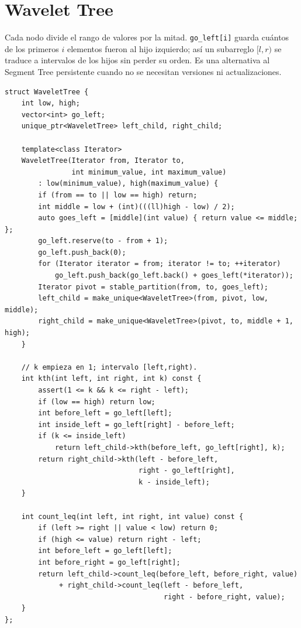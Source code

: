 \section{Wavelet Tree}

Cada nodo divide el rango de valores por la mitad. \texttt{go\_left[i]} guarda
cu\'antos de los primeros $i$ elementos fueron al hijo izquierdo; as\'i un
subarreglo $[l,r)$ se traduce a intervalos de los hijos sin perder su orden.
Es una alternativa al Segment Tree persistente cuando no se necesitan
versiones ni actualizaciones.


\begin{lstlisting}[style=cpp]
struct WaveletTree {
    int low, high;
    vector<int> go_left;
    unique_ptr<WaveletTree> left_child, right_child;

    template<class Iterator>
    WaveletTree(Iterator from, Iterator to,
                int minimum_value, int maximum_value)
        : low(minimum_value), high(maximum_value) {
        if (from == to || low == high) return;
        int middle = low + (int)(((ll)high - low) / 2);
        auto goes_left = [middle](int value) { return value <= middle; };
        go_left.reserve(to - from + 1);
        go_left.push_back(0);
        for (Iterator iterator = from; iterator != to; ++iterator)
            go_left.push_back(go_left.back() + goes_left(*iterator));
        Iterator pivot = stable_partition(from, to, goes_left);
        left_child = make_unique<WaveletTree>(from, pivot, low, middle);
        right_child = make_unique<WaveletTree>(pivot, to, middle + 1, high);
    }

    // k empieza en 1; intervalo [left,right).
    int kth(int left, int right, int k) const {
        assert(1 <= k && k <= right - left);
        if (low == high) return low;
        int before_left = go_left[left];
        int inside_left = go_left[right] - before_left;
        if (k <= inside_left)
            return left_child->kth(before_left, go_left[right], k);
        return right_child->kth(left - before_left,
                                right - go_left[right],
                                k - inside_left);
    }

    int count_leq(int left, int right, int value) const {
        if (left >= right || value < low) return 0;
        if (high <= value) return right - left;
        int before_left = go_left[left];
        int before_right = go_left[right];
        return left_child->count_leq(before_left, before_right, value)
             + right_child->count_leq(left - before_left,
                                      right - before_right, value);
    }
};
\end{lstlisting}

